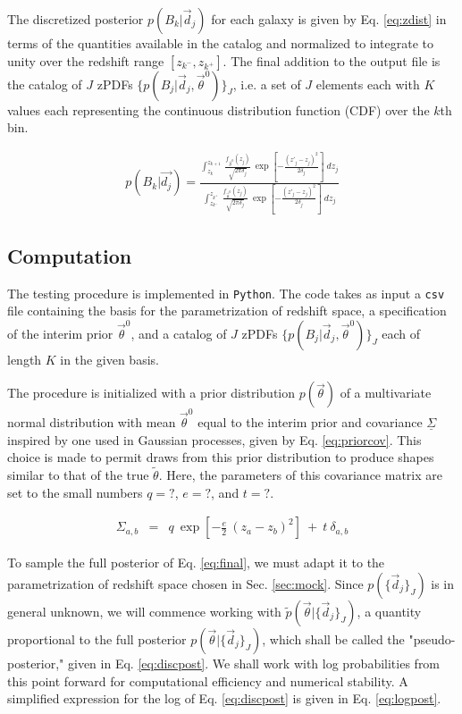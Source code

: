 \documentclass[preprint]{aastex}
\newcommand{\textul}{\underline}
\begin{document}
The discretized posterior $p(B_{k}|\vec{d}_{j})$ for each galaxy is given by 
Eq. \ref{eq:zdist} in terms of the quantities available in the catalog and 
normalized to integrate to unity over the redshift range 
$[z_{k^{-}},z_{k^{+}}]$.  The final addition to the output file is the catalog 
of $J$ zPDFs $\{p(B_{j}|\vec{d}_{j},\vec{\theta}^{0})\}_{J}$, i.e. a set of $J$ 
elements each with $K$ values each representing the continuous distribution 
function (CDF) over the $k$th bin.

\begin{eqnarray}
\label{eq:zdist}
p(B_{k}|\vec{d_{j}}) = \frac{\int_{z_{k}}^{z_{k+1}}\ 
\frac{f_{\vec{\theta}^{0}}(z_{j})}{\sqrt{2\pi\delta_{j}}}\ 
\exp\left[-\frac{(z'_{j}-z_{j})^{2}}{2\delta_{j}}\right]\ 
dz_{j}}{\int_{z_{k^{-}}}^{z_{k^{+}}}\ 
\frac{f_{\vec{\theta}^{0}}(z_{j})}{\sqrt{2\pi\delta_{j}}}\ 
\exp\left[-\frac{(z'_{j}-z_{j})^{2}}{2\delta_{j}}\right]\ dz_{j}}
\end{eqnarray}

\clearpage
\subsection{Computation}
\label{sec:mcmc}

The testing procedure is implemented in \texttt{Python}.  The code takes as 
input a \texttt{csv} file containing the basis for the parametrization of 
redshift space, a specification of the interim prior $\vec{\theta}^{0}$, and a 
catalog of $J$ zPDFs $\{p(B_{j}|\vec{d}_{j},\vec{\theta}^{0})\}_{J}$ each of 
length $K$ in the given basis.  

The procedure is initialized with a prior distribution $p(\vec{\theta})$ of a 
multivariate normal distribution with mean $\vec{\theta}^{0}$ equal to the 
interim prior and covariance $\textul{\Sigma}$ inspired by one used in Gaussian 
processes, given by Eq. \ref{eq:priorcov}.  This choice is made to permit draws 
from this prior distribution to produce shapes similar to that of the true 
$\tilde{\theta}$.  Here, the parameters of this covariance matrix are set to 
the small numbers $q=?$, $e=?$, and $t=?$.

\begin{eqnarray}
\label{eq:priorcov}
\Sigma_{a,b} &=& q\ \exp[-\frac{e}{2}\ (z_{a}-z_{b})^{2}]\ +\ t\ \delta_{a,b}
\end{eqnarray}

To sample the full posterior of Eq. \ref{eq:final}, we must adapt it to the 
parametrization of redshift space chosen in Sec. \ref{sec:mock}.  Since 
$p(\{\vec{d}_{j}\}_{J})$ is in general unknown, we will commence working with 
$\tilde{p}(\vec{\theta}|\{\vec{d}_{j}\}_{J})$, a quantity proportional to the 
full posterior $p(\vec{\theta}|\{\vec{d}_{j}\}_{J})$, which shall be called the 
"pseudo-posterior," given in Eq. \ref{eq:discpost}.  We shall work with log 
probabilities from this point forward for computational efficiency and 
numerical stability.  A simplified expression for the log of Eq. 
\ref{eq:discpost} is given in Eq. \ref{eq:logpost}.
\end{document}
